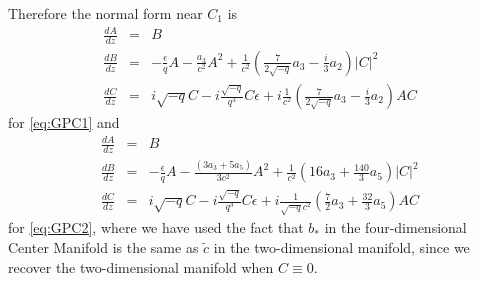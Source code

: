 Therefore the normal form near $C_1$ is 
\begin{subequations}\label{eq:GPC1normal}
\begin{eqnarray} \label{eq:GPC1normalA}
\frac{dA}{dz} &=& B \\ 
\frac{dB}{dz} &=& -\frac{\epsilon}{q} A - \frac{a_3}{c^2} A^2 + \frac{1}{c^2}\left( \frac{7}{2 \sqrt{-q} } a_3 - \frac{i}{3} a_2 \right)  \left|C\right|^2  \label{eq:GPC1normalB} \\
\frac{dC}{dz} &=& i \sqrt{-q} C - i \frac{\sqrt{-q} }{q^3} C\epsilon + i \frac{1}{c^2}\left( \frac{7}{2 \sqrt{-q} } a_3 - \frac{i}{3} a_2 \right)A C \label{eq:GPC1normalC}
\end{eqnarray}
\end{subequations}
for \eqref{eq:GPC1} and
\begin{subequations}\label{eq:GPC2normal}
\begin{eqnarray} \label{eq:GPC2normalA}
\frac{dA}{dz} &=& B \\ 
\frac{dB}{dz} &=& -\frac{\epsilon}{q} A -\frac{\left(3 a_3 + 5 a_5\right)}{3c^2} A^2 + \frac{1}{c^2}\left( 16 a_3 + \frac{140}{3} a_5 \right)  \left|C\right|^2  \label{eq:GPC2normalB} \\
\frac{dC}{dz} &=& i \sqrt{-q} C - i \frac{\sqrt{-q} }{q^3} C\epsilon + i \frac{1}{\sqrt{-q} c^2}\left( \frac{7}{2 } a_3 + \frac{32}{3} a_5 \right)A C \label{eq:GPC2normalC}
\end{eqnarray}
\end{subequations}
for \eqref{eq:GPC2}, where we have used the fact that $b_*$ in the four-dimensional Center Manifold is the same as $\tilde{c}$ in the two-dimensional manifold, since we recover the two-dimensional manifold when $C \equiv 0$.

